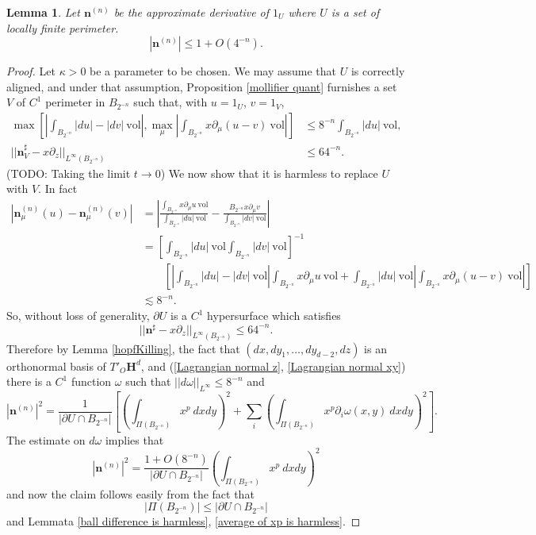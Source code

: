 \documentclass[reqno,12pt,letterpaper]{amsart}
\newcommand{\Hyp}{\mathbf H}
\newcommand{\normal}{\mathbf n}
\newcommand{\vol}{\mathrm{vol}}
\newtheorem{lemma}[theorem]{Lemma}
\theoremstyle{definition}
\numberwithin{equation}{section}
\begin{document}
\begin{lemma}\label{normal has length 1}
Let $\normal^{(n)}$ be the approximate derivative of $1_U$ where $U$ is a set of locally finite perimeter.
$$|\normal^{(n)}| \leq 1 + O(4^{-n}).$$
\end{lemma}
\begin{proof}
Let $\kappa > 0$ be a parameter to be chosen.
We may assume that $U$ is correctly aligned, and under that assumption, Proposition \ref{mollifier quant} furnishes a set $V$ of $C^1$ perimeter in $B_{2^{-n}}$ such that, with $u = 1_U$, $v = 1_V$,
\begin{align*}
\max\left[\left|\int_{B_{2^{-n}}} |du| - |dv| ~\vol\right|, \max_\mu \left|\int_{B_{2^{-n}}} x\partial_\mu(u - v) ~\vol\right|\right] &\leq 8^{-n} \int_{B_{2^{-n}}} |du| ~\vol, \\
||\normal^\sharp_V - x\partial_z||_{L^\infty(B_{2^{-n}})} &\leq 64^{-n}.
\end{align*}
(TODO: Taking the limit $t \to 0$)
We now show that it is harmless to replace $U$ with $V$. In fact
\begin{align*}
|\normal^{(n)}_\mu(u) - \normal^{(n)}_\mu(v)|
&= \left|\frac{\int_{B_{2^{-n}}} x\partial_\mu u ~\vol}{\int_{B_{2^{-n}}} |du| ~\vol} - \frac{B_{2^{-n}} x\partial_\mu v}{\int_{B_{2^{-n}}} |dv| ~\vol}\right|\\
&= \left[\int_{B_{2^{-n}}} |du| ~\vol \int_{B_{2^{-n}}} |dv| ~\vol\right]^{-1} \\
&\qquad \left[\left|\int_{B_{2^{-n}}} |du| - |dv| ~\vol\right| \int_{B_{2^{-n}}} x\partial_\mu u ~\vol+ \int_{B_{2^{-n}}} |du| ~\vol \left|\int_{B_{2^{-n}}} x\partial_\mu(u - v) ~\vol\right|\right] \\
&\lesssim 8^{-n}.
\end{align*}
So, without loss of generality, $\partial U$ is a $C^1$ hypersurface which satisfies
$$||\normal^\sharp - x\partial_z||_{L^\infty(B_{2^{-n}})} \leq 64^{-n}.$$
Therefore by Lemma \ref{hopfKilling}, the fact that $(dx, dy_1, \dots, dy_{d-2}, dz)$ is an orthonormal basis of $T'_O\Hyp^d$, and (\ref{Lagrangian normal z}, \ref{Lagrangian normal xy}) there is a $C^1$ function $\omega$ such that $||d\omega||_{L^\infty} \leq 8^{-n}$ and
$$|\normal^{(n)}|^2 = \frac{1}{|\partial U \cap B_{2^{-n}}|} \left[\left(\int_{\Pi(B_{2^{-n}})} x^p ~dxdy\right)^2 + \sum_i \left(\int_{\Pi(B_{2^{-n}})} x^p \partial_i \omega(x, y) ~dxdy\right)^2\right].$$
The estimate on $d\omega$ implies that
$$|\normal^{(n)}|^2 = \frac{1 + O(8^{-n})}{|\partial U \cap B_{2^{-n}}|}\left(\int_{\Pi(B_{2^{-n}})} x^p ~dxdy\right)^2$$
and now the claim follows easily from the fact that
$$|\Pi(B_{2^{-n}})| \leq |\partial U \cap B_{2^{-n}}|$$
and Lemmata \ref{ball difference is harmless}, \ref{average of xp is harmless}.
\end{proof}
\end{document}
